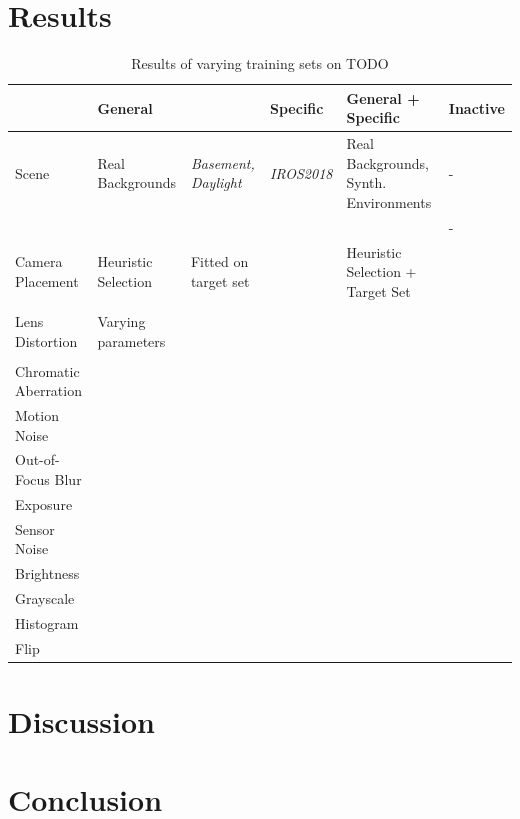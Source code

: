 \section{Results}
\label{sec:training:results}
\begin{table}[htbp]
	\caption{Results of varying training sets on TODO}
	\small
	\begin{tabular}{|p{3cm}|p{2cm}|p{2cm}|p{2cm}|p{3cm}|p{2cm}|}
		\hline
		& General &  & Specific & General + Specific & Inactive \\ \hline
		Scene & Real Backgrounds & \textit{Basement, Daylight} & \textit{IROS2018} & Real Backgrounds, Synth. Environments & - \\ \hline
		&  &  &  &  & - \\ \hline
		Camera Placement & Heuristic Selection & Fitted on target set &  & Heuristic Selection + Target Set &  \\ \hline
		&  &  &  &  &  \\ \hline
		Lens Distortion & Varying parameters &  &  &  &  \\ \hline
		&  &  &  &  &  \\ \hline
		Chromatic Aberration &  &  &  &  &  \\ \hline
		Motion Noise &  &  &  &  &  \\ \hline
		Out-of-Focus Blur &  &  &  &  &  \\ \hline
		Exposure &  &  &  &  &  \\ \hline
		Sensor Noise &  &  &  &  &  \\ \hline
		Brightness &  &  &  &  &  \\ \hline
		Grayscale &  &  &  &  &  \\ \hline
		Histogram &  &  &  &  &  \\ \hline
		Flip &  &  &  &  &  \\ \hline
	\end{tabular}
	\label{genvsspec}
\end{table}

\section{Discussion}
\label{sec:training:discussion}

\section{Conclusion}
\label{sec:training:conclusion}


